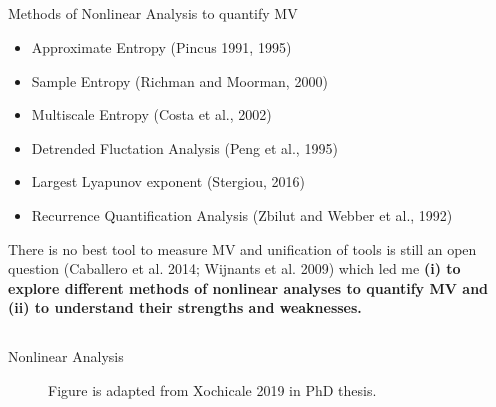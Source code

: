 \subsection{}
{
{
\begin{frame}{Methods of Nonlinear Analysis to quantify MV}


\begin{itemize}
	\item Approximate Entropy (Pincus 1991, 1995)
	\item Sample Entropy (Richman and Moorman, 2000)
	\item Multiscale Entropy (Costa et al., 2002)
	\item Detrended Fluctation Analysis (Peng et al., 1995)
	\item Largest Lyapunov exponent (Stergiou, 2016)
	\item Recurrence Quantification Analysis (Zbilut and Webber et al., 1992)

\end{itemize}

There is no best tool to measure MV and unification of tools is still
an open question (Caballero et al. 2014; Wijnants et al. 2009)
which led me 
\bf{(i) to explore different methods of nonlinear analyses to quantify MV} and  
\bf{(ii) to understand their strengths and weaknesses}. 

\end{frame}
}



\subsection{}
{

\begin{frame}{Nonlinear Analysis}
    \begin{figure}
	{Figure is adapted from Xochicale 2019 in PhD thesis.} 
   \end{figure}
	

\end{frame}}}
